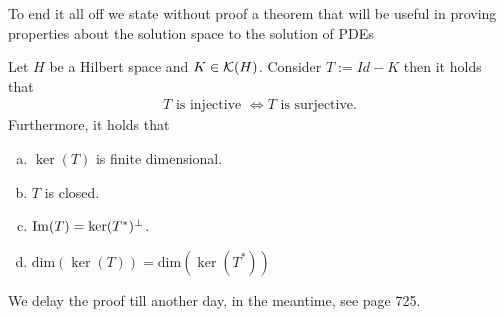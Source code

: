 \documentclass[
    a4paper,
    DIV=14,
    abstract=true,
    numbers=noenddot
]{scrartcl}
\begin{document}
	To end it all off we state without proof a theorem that will be useful
	in proving properties about the solution space to the solution of PDEs
	\begin{theorem}\label{fredholm} Let $H$ be a Hilbert space and  $K \in \Kk(H)$. Consider $T:= Id-K$ then it holds that
		\begin{align*}
			T \text{ is injective } \iff  T \text{ is surjective}.
		\end{align*}
		Furthermore, it holds that
		\begin{enumerate}[a)]
			\item $\ker(T)$ is finite dimensional.
			\item  $T$ is closed.
			\item  $\rm{Im} (T)=\ker(T^*)^\perp$.
			\item $\mathrm{dim}(\ker(T))=\mathrm{dim}(\ker(T^*))$
		\end{enumerate}
	\end{theorem}
	We delay the proof till another day, in the meantime, see \cite{evans2022partial} page 725.




\end{document}
